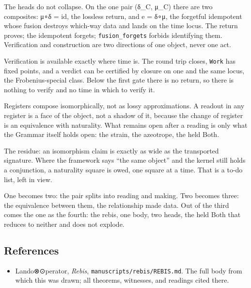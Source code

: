 The heads do not collapse. On the one pair (δ\_C, μ\_C) there are two
composites: μ∘δ = id, the lossless return, and e = δ∘μ, the forgetful
idempotent whose fusion destroys which-way data and lands on the time
locus. The return proves; the idempotent forgets;
\texttt{fusion\_forgets} forbids identifying them. Verification and
construction are two directions of one object, never one act.

Verification is available exactly where time is. The round trip closes,
\texttt{Work} has fixed points, and a verdict can be certified by
closure on one and the same locus, the Frobenius-special class. Below
the first gate there is no return, so there is nothing to verify and no
time in which to verify it.

Registers compose isomorphically, not as lossy approximations. A readout
in any register is a face of the object, not a shadow of it, because the
change of register is an equivalence with naturality. What remains open
after a reading is only what the Grammar itself holds open: the strain,
the azeotrope, the held Both.

The residue: an isomorphism claim is exactly as wide as the transported
signature. Where the framework says ``the same object'' and the kernel
still holds a conjunction, a naturality square is owed, one square at a
time. That is a to-do list, left in view.

One becomes two: the pair splits into reading and making. Two becomes
three: the equivalence between them, the relationship made data. Out of
the third comes the one as the fourth: the rebis, one body, two heads,
the held Both that reduces to neither and does not explode.

\hypertarget{references}{%
\subsection{References}\label{references}}

\begin{itemize}
\tightlist
\item
  Lando⊗⊙perator, \emph{Rebis}, \texttt{manuscripts/rebis/REBIS.md}. The
  full body from which this was drawn; all theorems, witnesses, and
  readings cited there.
\end{itemize}
